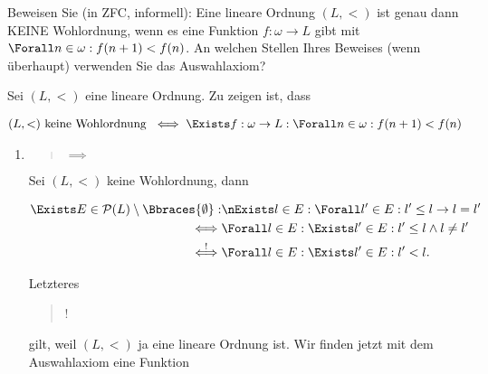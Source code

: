 
\begin{exercise}[286]

Beweisen Sie (in ZFC, informell):
Eine lineare Ordnung $(L, <)$ ist genau dann KEINE Wohlordnung, wenn es eine Funktion $f: \omega \to L$ gibt mit $\Forall n \in \omega: f(n + 1) < f(n)$.
An welchen Stellen Ihres Beweises (wenn überhaupt) verwenden Sie das Auswahlaxiom?

\end{exercise}


\begin{solution}

Sei $(L, <)$ eine lineare Ordnung.
Zu zeigen ist, dass

\begin{align*}
    (L, <) ~\text{keine Wohlordnung}~
    \iff
    \Exists f: \omega \to L:
        \Forall n \in \omega:
            f(n + 1) < f(n)
\end{align*}

\begin{enumerate}[label = \texttt{ad}]

    \item \blockquote{$\implies$}:

    Sei $(L, <)$ keine Wohlordnung, dann

    \begin{align} \label{eq:keine_Wohlordnung}
        \begin{split}
            \Exists E \in \mathcal{P}(L) \setminus \Bbraces{\emptyset}:
                & \nExists l \in E:
                    \Forall l^\prime \in E:
                        l^\prime \leq l \to l = l^\prime \\
                \iff
                & \Forall l \in E:
                    \Exists l^\prime \in E:
                        l^\prime \leq l \land l \neq l^\prime \\
                \stackrel{!}{\iff}
                & \Forall l \in E:
                    \Exists l^\prime \in E:
                        l^\prime < l.
        \end{split}
    \end{align}

    Letzteres \blockquote{!} gilt, weil $(L, <)$ ja eine lineare Ordnung ist.
    Wir finden jetzt mit dem Auswahlaxiom eine Funktion


\end{enumerate}
\end{solution}
